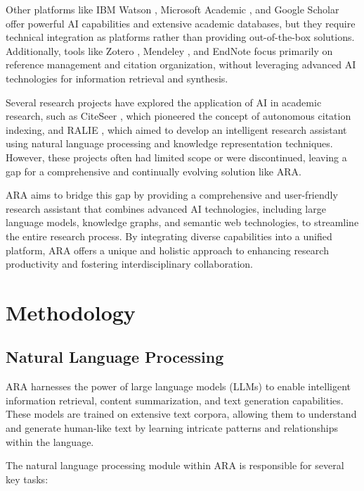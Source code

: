 \documentclass[a4paper,conference]{IEEEtran}
\begin{document}
Other platforms like IBM Watson \cite{ibmwatson}, Microsoft Academic \cite{microsoftacademic}, and Google Scholar \cite{googlescholar} offer powerful AI capabilities and extensive academic databases, but they require technical integration as platforms rather than providing out-of-the-box solutions. Additionally, tools like Zotero \cite{zotero}, Mendeley \cite{mendeley}, and EndNote \cite{endnote} focus primarily on reference management and citation organization, without leveraging advanced AI technologies for information retrieval and synthesis.

Several research projects have explored the application of AI in academic research, such as CiteSeer \cite{citeseer}, which pioneered the concept of autonomous citation indexing, and RALIE \cite{ralie}, which aimed to develop an intelligent research assistant using natural language processing and knowledge representation techniques. However, these projects often had limited scope or were discontinued, leaving a gap for a comprehensive and continually evolving solution like ARA.

ARA aims to bridge this gap by providing a comprehensive and user-friendly research assistant that combines advanced AI technologies, including large language models, knowledge graphs, and semantic web technologies, to streamline the entire research process. By integrating diverse capabilities into a unified platform, ARA offers a unique and holistic approach to enhancing research productivity and fostering interdisciplinary collaboration.

\section{Methodology}

\subsection{Natural Language Processing}
ARA harnesses the power of large language models (LLMs) to enable intelligent information retrieval, content summarization, and text generation capabilities. These models are trained on extensive text corpora, allowing them to understand and generate human-like text by learning intricate patterns and relationships within the language.

The natural language processing module within ARA is responsible for several key tasks:
\end{document}

